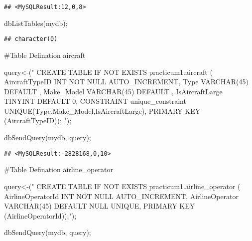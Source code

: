 \documentclass[
]{article}
\newenvironment{Shaded}{\begin{snugshade}}{\end{snugshade}}
\newcommand{\FunctionTok}[1]{\textcolor[rgb]{0.00,0.00,0.00}{#1}}
\newcommand{\NormalTok}[1]{#1}
\newcommand{\OtherTok}[1]{\textcolor[rgb]{0.56,0.35,0.01}{#1}}
\newcommand{\StringTok}[1]{\textcolor[rgb]{0.31,0.60,0.02}{#1}}
\begin{document}
\begin{verbatim}
## <MySQLResult:12,0,8>
\end{verbatim}

\begin{Shaded}
\begin{Highlighting}[]
\FunctionTok{dbListTables}\NormalTok{(mydb);}
\end{Highlighting}
\end{Shaded}

\begin{verbatim}
## character(0)
\end{verbatim}

\#Table Defination aircraft

\begin{Shaded}
\begin{Highlighting}[]
\NormalTok{query}\OtherTok{\textless{}{-}}\NormalTok{(}\StringTok{"}
\StringTok{  CREATE TABLE IF NOT EXISTS practicum1.\textasciigrave{}aircraft\textasciigrave{} (}
\StringTok{  \textasciigrave{}AircraftTypeID\textasciigrave{} INT NOT NULL AUTO\_INCREMENT,}
\StringTok{  \textasciigrave{}Type\textasciigrave{} VARCHAR(45) DEFAULT \textquotesingle{} \textquotesingle{},}
\StringTok{  \textasciigrave{}Make\_Model\textasciigrave{} VARCHAR(45) DEFAULT \textquotesingle{} \textquotesingle{},}
\StringTok{  \textasciigrave{}IsAircraftLarge\textasciigrave{} TINYINT DEFAULT 0,}
\StringTok{  CONSTRAINT unique\_constraint UNIQUE(Type,Make\_Model,IsAircraftLarge),}
\StringTok{  PRIMARY KEY (\textasciigrave{}AircraftTypeID\textasciigrave{}));}
\StringTok{"}\NormalTok{);}

\FunctionTok{dbSendQuery}\NormalTok{(mydb, query);}
\end{Highlighting}
\end{Shaded}

\begin{verbatim}
## <MySQLResult:-2828168,0,10>
\end{verbatim}

\#Table Defination airline\_operator

\begin{Shaded}
\begin{Highlighting}[]
\NormalTok{query}\OtherTok{\textless{}{-}}\NormalTok{(}\StringTok{"}
\StringTok{  CREATE TABLE IF NOT EXISTS practicum1.\textasciigrave{}airline\_operator\textasciigrave{} (}
\StringTok{  \textasciigrave{}AirlineOperatorId\textasciigrave{} INT NOT NULL AUTO\_INCREMENT,}
\StringTok{  \textasciigrave{}AirlineOperator\textasciigrave{} VARCHAR(45) DEFAULT \textquotesingle{} \textquotesingle{} NULL UNIQUE,}
\StringTok{  PRIMARY KEY (\textasciigrave{}AirlineOperatorId\textasciigrave{}));"}\NormalTok{);}

\FunctionTok{dbSendQuery}\NormalTok{(mydb, query);}
\end{Highlighting}
\end{Shaded}
\end{document}
